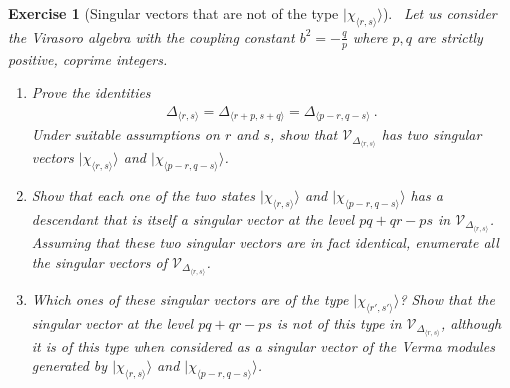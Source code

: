 \documentclass[12pt, a4paper, notitlepage, twoside]{report}
\numberwithin{equation}{section}
\theoremstyle{break}
\newtheorem{exo}{Exercise}[chapter]
\begin{document}
\begin{exo}[Singular vectors that are not of the type $|\chi_{\langle r,s \rangle}\rangle$]
 ~\label{exosv}
Let us consider the Virasoro algebra with the coupling constant $b^2=-\frac{q}{p}$ where $p,q$ are strictly positive, coprime integers.
\begin{enumerate}
 \item 
Prove the identities 
\begin{align}
 \Delta_{\langle r,s \rangle}=\Delta_{\langle r+p,s+q \rangle}=\Delta_{\langle p-r,q-s \rangle}\ .
\end{align}
Under suitable assumptions on $r$ and $s$, show that $\mathcal{V}_{\Delta_{\langle r,s \rangle}}$ has two singular vectors $|\chi_{\langle r,s \rangle}\rangle$ and $|\chi_{\langle p-r,q-s \rangle}\rangle$.
\item
Show that each one of the two states  $|\chi_{\langle r,s \rangle}\rangle$ and $|\chi_{\langle p-r,q-s \rangle}\rangle$ has a descendant that is itself a singular vector at the level $pq+qr-ps$ in $\mathcal{V}_{\Delta_{\langle r,s \rangle}}$.
Assuming that these two singular vectors are in fact identical, enumerate all the singular vectors of $\mathcal{V}_{\Delta_{\langle r,s \rangle}}$.
\item
Which ones of these singular vectors are of the type $|\chi_{\langle r',s' \rangle}\rangle$? Show that the singular vector at the level $pq+qr-ps$ is not of this type in $\mathcal{V}_{\Delta_{\langle r,s \rangle}}$, although it is of this type when considered as a singular vector of the Verma modules generated by $|\chi_{\langle r,s \rangle}\rangle$ and $|\chi_{\langle p-r,q-s \rangle}\rangle$.
\end{enumerate}
\end{exo}
\end{document}
